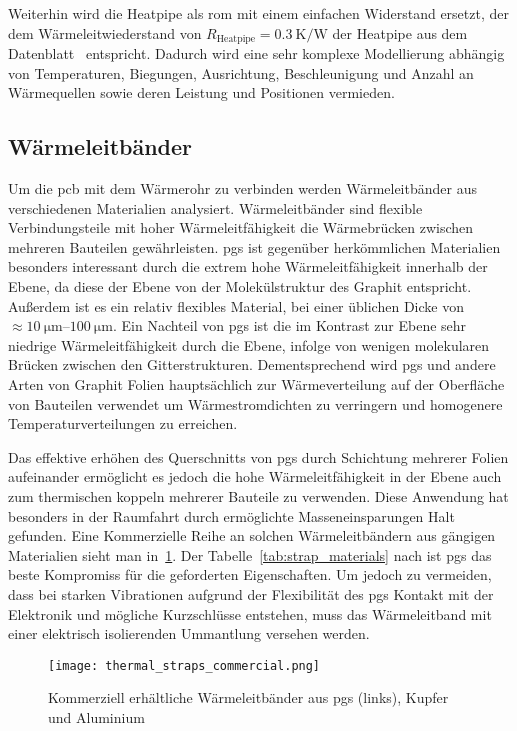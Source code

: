Weiterhin wird die Heatpipe als \ac{rom} mit einem einfachen Widerstand ersetzt, der dem Wärmeleitwiederstand von $R_\mathrm{Heatpipe} = \SI{0,3}{\kelvin\per\watt}$ der Heatpipe aus dem Datenblatt~\cite{QuickOhm-Heatpipe-5x400} entspricht.
Dadurch wird eine sehr komplexe Modellierung abhängig von Temperaturen, Biegungen, Ausrichtung, Beschleunigung und Anzahl an Wärmequellen sowie deren Leistung und Positionen vermieden.

\subsection{Wärmeleitbänder}\label{sec:waermebaender}

Um die \ac{pcb} mit dem Wärmerohr zu verbinden werden Wärmeleitbänder aus verschiedenen Materialien analysiert.
Wärmeleitbänder sind flexible Verbindungsteile mit hoher Wärmeleitfähigkeit die Wärmebrücken zwischen mehreren Bauteilen gewährleisten.
\ac{pgs} ist gegenüber herkömmlichen Materialien besonders interessant durch die extrem hohe Wärmeleitfähigkeit innerhalb der Ebene,
da diese der Ebene von der Molekülstruktur des Graphit entspricht. Außerdem ist es ein relativ flexibles Material, bei einer üblichen Dicke von $\approx \SIrange{10}{100}{\micro\meter}$.
Ein Nachteil von \ac{pgs} ist die im Kontrast zur Ebene sehr niedrige Wärmeleitfähigkeit durch die Ebene, infolge von wenigen
molekularen Brücken zwischen den Gitterstrukturen. Dementsprechend wird \ac{pgs} und andere Arten von Graphit Folien hauptsächlich zur
Wärmeverteilung auf der Oberfläche von Bauteilen verwendet um Wärmestromdichten zu verringern und homogenere Temperaturverteilungen zu erreichen.

Das effektive erhöhen des Querschnitts von \ac{pgs} durch Schichtung mehrerer Folien aufeinander ermöglicht es jedoch die hohe
Wärmeleitfähigkeit in der Ebene auch zum thermischen koppeln mehrerer Bauteile zu verwenden. Diese Anwendung hat besonders in der 
Raumfahrt durch ermöglichte Masseneinsparungen Halt gefunden. Eine Kommerzielle Reihe an solchen Wärmeleitbändern aus gängigen Materialien sieht man in~\ref{fig:thermalstraps_commercial}.
Der Tabelle~\ref{tab:strap_materials} nach ist \ac{pgs} das beste Kompromiss für die geforderten Eigenschaften. Um jedoch zu vermeiden, dass
bei starken Vibrationen aufgrund der Flexibilität des \ac{pgs} Kontakt mit der Elektronik und mögliche Kurzschlüsse entstehen, muss das Wärmeleitband mit einer elektrisch
isolierenden Ummantlung versehen werden.

\begin{figure}[H]
  \centering
  \texttt{[image: thermal\_straps\_commercial.png]}
  \caption{Kommerziell erhältliche Wärmeleitbänder aus \ac{pgs} (links), Kupfer und Aluminium~\cite{Thermal-Straps}}\label{fig:thermalstraps_commercial}
\end{figure}

